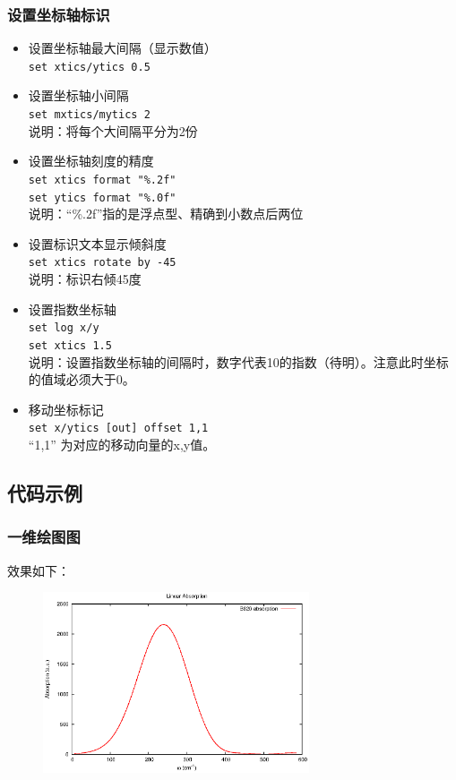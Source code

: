 \subsubsection{设置坐标轴标识}
\begin{itemize}
\item 设置坐标轴最大间隔（显示数值）\\
\verb|set xtics/ytics 0.5|

\item 设置坐标轴小间隔\\
\verb|set mxtics/mytics 2|\\
说明：将每个大间隔平分为2份

\item 设置坐标轴刻度的精度\\
\verb|set xtics format "%.2f"|\\
\verb|set ytics format "%.0f"|\\
说明：“\%.2f”指的是浮点型、精确到小数点后两位

\item 设置标识文本显示倾斜度\\
\verb|set xtics rotate by -45|\\
说明：标识右倾45度

\item 设置指数坐标轴\\
\verb|set log x/y|\\
\verb|set xtics 1.5|\\
说明：设置指数坐标轴的间隔时，数字代表10的指数（待明）。注意此时坐标的值域必须大于0。

\item 移动坐标标记\\
\verb|set x/ytics [out] offset 1,1|\\
“1,1” 为对应的移动向量的x,y值。
\end{itemize}



\subsection{代码示例}
\subsubsection{一维绘图图}

效果如下：
\begin{figure}[htb]
\centering
\includegraphics[width=0.7\textwidth]{program/gnuplot/diagonal.eps}
\end{figure}



